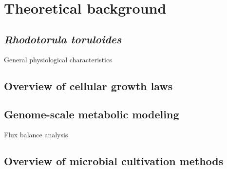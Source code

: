\chapter{Theoretical background}

\section{\textit{Rhodotorula toruloides}}

General physiological characteristics

\section{Overview of cellular growth laws}

\section{Genome-scale metabolic modeling}


Flux balance analysis

\section{Overview of microbial cultivation methods}





